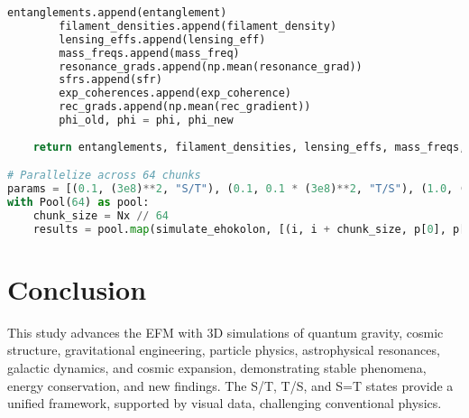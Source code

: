 \documentclass[11pt]{article}
\begin{document}
\begin{lstlisting}[language=Python, caption={Fluxonic Grand Predictions Simulation}, label=lst:simulation]
        entanglements.append(entanglement)
        filament_densities.append(filament_density)
        lensing_effs.append(lensing_eff)
        mass_freqs.append(mass_freq)
        resonance_grads.append(np.mean(resonance_grad))
        sfrs.append(sfr)
        exp_coherences.append(exp_coherence)
        rec_grads.append(np.mean(rec_gradient))
        phi_old, phi = phi, phi_new
    
    return entanglements, filament_densities, lensing_effs, mass_freqs, resonance_grads, sfrs, exp_coherences, rec_grads

# Parallelize across 64 chunks
params = [(0.1, (3e8)**2, "S/T"), (0.1, 0.1 * (3e8)**2, "T/S"), (1.0, (3e8)**2, "S=T")]
with Pool(64) as pool:
    chunk_size = Nx // 64
    results = pool.map(simulate_ehokolon, [(i, i + chunk_size, p[0], p[1]) for i in range(0, Nx, chunk_size) for p in params])
\end{lstlisting}

\section{Conclusion}
This study advances the EFM with 3D simulations of quantum gravity, cosmic structure, gravitational engineering, particle physics, astrophysical resonances, galactic dynamics, and cosmic expansion, demonstrating stable phenomena, energy conservation, and new findings. The S/T, T/S, and S=T states provide a unified framework, supported by visual data, challenging conventional physics.
\end{document}
